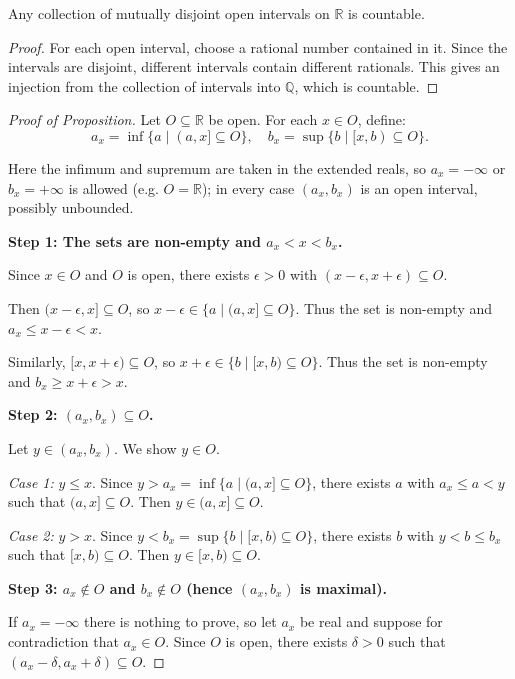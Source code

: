 \documentclass[11pt]{report}
\begin{document}
\begin{lembox}
Any collection of mutually disjoint open intervals on $\mathbb{R}$ is countable.
\end{lembox}

\begin{proof}
For each open interval, choose a rational number contained in it. Since the intervals are disjoint, different intervals contain different rationals. This gives an injection from the collection of intervals into $\mathbb{Q}$, which is countable.
\end{proof}

\begin{proof}[Proof of Proposition]
Let $O \subseteq \mathbb{R}$ be open. For each $x \in O$, define:
\[
a_x = \inf\{a \mid (a, x] \subseteq O\}, \quad b_x = \sup\{b \mid [x, b) \subseteq O\}.
\]

Here the infimum and supremum are taken in the extended reals, so $a_x = -\infty$ or $b_x = +\infty$ is allowed (e.g. $O = \mathbb{R}$); in every case $(a_x, b_x)$ is an open interval, possibly unbounded.

\textbf{Step 1: The sets are non-empty and $a_x < x < b_x$.}

Since $x \in O$ and $O$ is open, there exists $\epsilon > 0$ with $(x - \epsilon, x + \epsilon) \subseteq O$.

Then $(x - \epsilon, x] \subseteq O$, so $x - \epsilon \in \{a \mid (a, x] \subseteq O\}$. Thus the set is non-empty and $a_x \leq x - \epsilon < x$.

Similarly, $[x, x + \epsilon) \subseteq O$, so $x + \epsilon \in \{b \mid [x, b) \subseteq O\}$. Thus the set is non-empty and $b_x \geq x + \epsilon > x$.

\textbf{Step 2: $(a_x, b_x) \subseteq O$.}

Let $y \in (a_x, b_x)$. We show $y \in O$.

\textit{Case 1:} $y \leq x$. Since $y > a_x = \inf\{a \mid (a, x] \subseteq O\}$, there exists $a$ with $a_x \leq a < y$ such that $(a, x] \subseteq O$. Then $y \in (a, x] \subseteq O$.

\textit{Case 2:} $y > x$. Since $y < b_x = \sup\{b \mid [x, b) \subseteq O\}$, there exists $b$ with $y < b \leq b_x$ such that $[x, b) \subseteq O$. Then $y \in [x, b) \subseteq O$.

\textbf{Step 3: $a_x \notin O$ and $b_x \notin O$ (hence $(a_x, b_x)$ is maximal).}

If $a_x = -\infty$ there is nothing to prove, so let $a_x$ be real and suppose for contradiction that $a_x \in O$. Since $O$ is open, there exists $\delta > 0$ such that $(a_x - \delta, a_x + \delta) \subseteq O$.


\end{proof}
\end{document}
